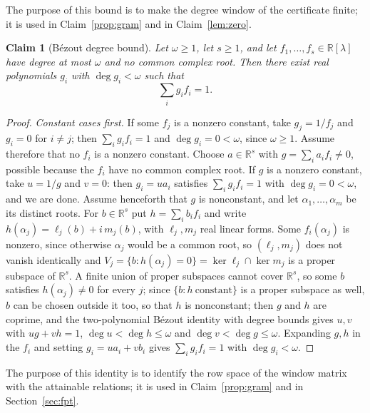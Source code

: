 \documentclass[journal]{IEEEtran}
\theoremstyle{plainn}
\newtheorem{claim}{Claim}
\theoremstyle{remark}
\begin{document}
The purpose of this bound is to make the degree window of the certificate finite; it is used in Claim~\ref{prop:gram} and in Claim~\ref{lem:zero}.

\begin{claim}[B\'ezout degree bound]\label{lem:bezout}\label{sec:bezout}
Let $\omega\ge1$, let $s\ge1$, and let $f_1,\ldots,f_s\in\mathbb R[\lambda]$ have
degree at most $\omega$ and no common complex root. Then there exist
real polynomials $g_i$ with $\deg g_i<\omega$ such that
\begin{equation}
\sum_i g_i f_i=1 .
\end{equation}
\end{claim}

\begin{proof}
\emph{Constant cases first.} If some $f_j$ is a nonzero constant, take $g_j=1/f_j$ and $g_i=0$ for
$i\neq j$; then $\sum_i g_if_i=1$ and $\deg g_i=0<\omega$, since $\omega\ge1$. Assume therefore that no
$f_i$ is a nonzero constant. Choose $a\in\mathbb R^s$ with $g=\sum_i a_if_i\neq0$, possible because the
$f_i$ have no common complex root. If $g$ is a nonzero constant, take $u=1/g$ and $v=0$: then
$g_i=ua_i$ satisfies $\sum_i g_if_i=1$ with $\deg g_i=0<\omega$, and we are done. Assume henceforth
that $g$ is nonconstant, and let $\alpha_1,\dots,\alpha_m$ be its distinct roots. For $b\in\mathbb R^s$ put
$h=\sum_i b_if_i$ and write $h(\alpha_j)=\ell_j(b)+i\,m_j(b)$, with $\ell_j,m_j$ real linear forms.
Some $f_i(\alpha_j)$ is nonzero, since otherwise $\alpha_j$ would be a common root, so $(\ell_j,m_j)$
does not vanish identically and $V_j=\{b:h(\alpha_j)=0\}=\ker\ell_j\cap\ker m_j$ is a proper subspace
of $\mathbb R^s$. A finite union of proper subspaces cannot cover $\mathbb R^s$, so some $b$ satisfies
$h(\alpha_j)\neq0$ for every $j$; since $\{b:h\ \text{constant}\}$ is a proper subspace as well,
$b$ can be chosen outside it too, so that $h$ is nonconstant; then $g$ and $h$ are coprime, and the
two-polynomial B\'ezout identity with degree bounds \cite[Ch.~3]{vzgg13} gives $u,v$ with $ug+vh=1$, $\deg u<\deg h\le\omega$
and $\deg v<\deg g\le\omega$. Expanding $g,h$ in the $f_i$ and setting $g_i=ua_i+vb_i$ gives
$\sum_i g_if_i=1$ with $\deg g_i<\omega$.
\end{proof}

The purpose of this identity is to identify the row space of the window matrix with the attainable relations; it is used in Claim~\ref{prop:gram} and in Section~\ref{sec:fpt}.
\end{document}
